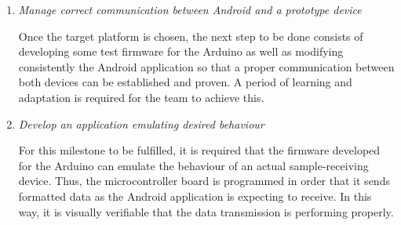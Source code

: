 \begin{enumerate}
				\item \emph{Manage correct communication between Android and a prototype device}\\
					\begin{comment}
					When we reciebe our google ADK(link to an image?) we investigate documentacion and we start 
					to develop a small arduino aplication based on the expamples, paraelly we develop the android 
					USB device part(link) that we be needed to test this part of  communication. The initial develop, 
					just to make the first test was a little long, because even been the main parts of the 
					implementation os USB comunication made we need to learn how to use it. Our first attempts was 
					no very productives because arduino was a new develop platform but especially because this was 
					our first try with android USB comunication.
					\end{comment}
					Once the target platform is chosen, the next step to be done consists of developing some
					test firmware for the Arduino as well as modifying consistently the Android application
					so that a proper communication between both devices can be established and proven. A period 
					of learning and adaptation is required for the team to achieve this.
	
				\item \emph{Develop an application emulating desired behaviour}\\
					\begin{comment}
					Several days later we achieve to Andorid and ADK view each other, but in our definitive test we
					discover that the communication was not correct because what anyones send was not recibed equally
					by the other one. But finally we discover what was going wrong and fix it to view how our first 
					milestone has been ahieved.\\
					\end{comment}
					For this milestone to be fulfilled, it is required that the firmware developed for the
					Arduino can emulate the behaviour of an actual sample-receiving device. Thus, the
					microcontroller board is programmed in order that it sends formatted data as the Android
					application is expecting to receive. In this way, it is visually verifiable that the
					data transmission is performing properly.
			\end{enumerate}
	
